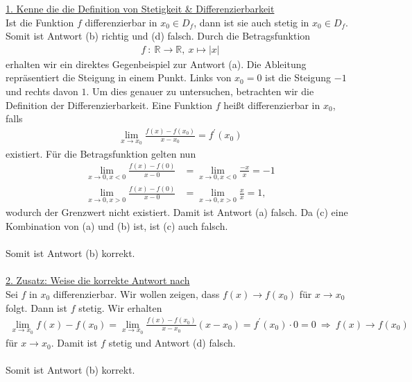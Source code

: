 \underline{1. Kenne die die Definition von Stetigkeit \& Differenzierbarkeit}\\
Ist die Funktion $ f $ differenzierbar in $ x_0 \in D_f $, dann ist sie auch stetig in $ x_0 \in D_f $.
Somit ist Antwort (b) richtig und (d) falsch.
Durch die Betragsfunktion
\begin{align*}
f \ : \ \mathbb{R} \to \mathbb{R}, \ x \mapsto |x|
\end{align*}
erhalten wir ein direktes Gegenbeispiel zur Antwort (a).
Die Ableitung repräsentiert die Steigung in einem Punkt. Links von $ x_0 = 0 $ ist die Steigung $ -1 $ und rechts davon $ 1 $.
Um dies genauer zu untersuchen, betrachten wir die Definition der Differenzierbarkeit. Eine Funktion $ f $ heißt differenzierbar in $ x_0 $, falls
\begin{align*}
\lim \limits_{x \to x_0} \frac{f(x) - f(x_0)}{x- x_0} = f^\prime(x_0)
\end{align*}
existiert. Für die Betragsfunktion gelten nun
\begin{align*}
\lim \limits_{x \to 0, x <0 } \frac{f(x) - f(0)}{x- 0}
&= \lim \limits_{x \to 0, x <0 } \frac{-x }{x} = -1\\
\lim \limits_{x \to 0, x >0 } \frac{f(x) - f(0)}{x- 0}
&= \lim \limits_{x \to 0, x >0 } \frac{x }{x} = 1,
\end{align*}
wodurch der Grenzwert nicht existiert. Damit ist Antwort (a) falsch.
Da (c) eine Kombination von (a) und (b) ist, ist (c) auch falsch.\\
\\
Somit ist Antwort (b) korrekt.
\\
\\
\underline{2. Zusatz: Weise die korrekte Antwort nach}\\
Sei $ f $ in $ x_0 $ differenzierbar. 
Wir wollen zeigen, dass $ f(x) \to f(x_0) $ für $ x \to x_0 $ folgt.
Dann ist $ f $ stetig.
Wir erhalten
\begin{align*}
\lim \limits_{x \to x_0} f(x) - f(x_0)
= 
\lim \limits_{x \to x_0} \frac{f(x) - f(x_0)}{x- x_0}(x-x_0)
=
f^\prime(x_0) \cdot 0 = 0
\
\Rightarrow 
\
f(x) \to f(x_0)
\end{align*}
für $ x \to x_0 $. Damit ist $ f $ stetig und Antwort (d) falsch.\\
\\
Somit ist Antwort (b) korrekt.
 \newpage

